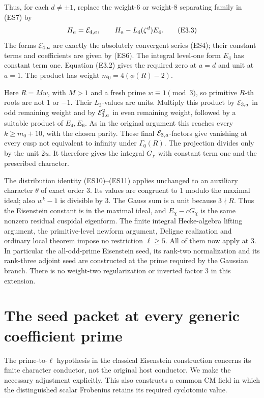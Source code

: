 Thus, for each \(d\ne\pm1\), replace the weight-\(6\)
or weight-\(8\) separating family in (ES7) by
\[
                H_a={\cal E}_{4,a},\qquad
                H_a-L_4(\zeta^d)E_4 .
 \tag{E3.3}
\]
The forms \({\cal E}_{4,a}\) are exactly the absolutely
convergent series (ES4); their constant terms and
coefficients are given by (ES6).
The integral level-one form \(E_4\) has constant term one.
Equation (E3.2) gives the required zero at \(a=d\)
and unit at \(a=1\).
The product has weight
\(m_0=4(\phi(R)-2)\).

Here \(R=Mw\), with \(M>1\) and a fresh prime
\(w\equiv1\pmod3\), so primitive \(R\)-th roots are not
\(1\) or \(-1\).
Their \(L_3\)-values are units.
Multiply this product by \({\cal E}_{3,a}\) in odd
remaining weight and by \({\cal E}_{3,a}^2\) in even
remaining weight, followed by a suitable product of
\(E_4,E_6\).
As in the original argument this reaches every
\(k\ge m_0+10\), with the chosen parity.
These final \({\cal E}_{3,a}\)-factors give vanishing
at every cusp not equivalent to infinity under
\(\Gamma_0(R)\).
The projection divides only by the unit \(2u\).
It therefore gives the integral \(G_\chi\) with
constant term one and the prescribed character.

The distribution identity (ES10)--(ES11) applies unchanged
to an auxiliary character \(\theta\) of exact order \(3\).
Its values are congruent to \(1\) modulo the maximal ideal;
also \(w^k-1\) is divisible by \(3\).
The Gauss sum is a unit because \(3\nmid R\).
Thus the Eisenstein constant is in the maximal ideal,
and \(E_\chi-cG_\chi\) is the same nonzero residual
cuspidal eigenform.
The finite integral Hecke-algebra lifting argument,
the primitive-level newform argument, Deligne realization
and ordinary local theorem impose no restriction
\(\ell\ge5\).
All of them now apply at \(3\).
In particular the all-odd-prime Eisenstein seed, its
rank-two normalization and its rank-three adjoint seed
are constructed at the prime required by the Gaussian
branch.
There is no weight-two regularization or inverted
factor \(3\) in this extension.


\section{The seed packet at every generic coefficient prime}
\label{sec:seed-all-generic-primes}

The prime-to-\(\ell\) hypothesis in the classical
Eisenstein construction concerns its finite character
conductor, not the original host conductor.
We make the necessary adjustment explicitly.
This also constructs a common CM field in which the
distinguished scalar Frobenius retains its required
cyclotomic value.

